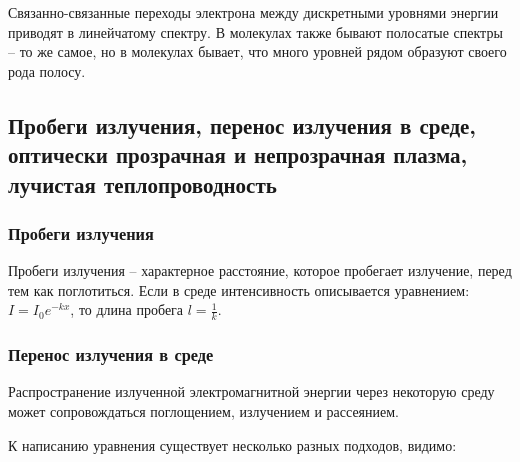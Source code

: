 \documentclass[10pt, a4paper]{article}
\begin{document}
Связанно-связанные переходы электрона между дискретными уровнями энергии приводят в линейчатому спектру. В молекулах также
бывают полосатые спектры -- то же самое, но в молекулах бывает, что много уровней рядом образуют своего рода полосу.

\subsection{Пробеги излучения, перенос излучения в среде, оптически прозрачная и непрозрачная плазма, лучистая теплопроводность}

\subsubsection{Пробеги излучения}

Пробеги излучения -- характерное расстояние, которое пробегает излучение, перед тем как поглотиться. Если в среде интенсивность описывается уравнением: $I=I_0e^{-kx}$, то длина пробега $l=\frac{1}{k}$.

\subsubsection{Перенос излучения в среде}

Распространение излученной электромагнитной энергии через некоторую среду может сопровождаться поглощением, излучением и рассеянием.

К написанию уравнения существует несколько разных подходов, видимо:
\end{document}
